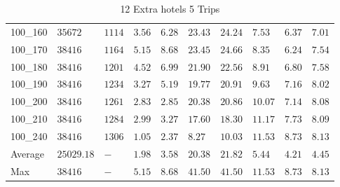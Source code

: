 \begin{center}
\begin{table}[]
\begin{adjustwidth}{-0.4in}{-1in}
\begin{tabular}{|lll|l|l|ll|lll|}
100\_160 & $35672   $  & $1114$ & $3.56$ & $6.28$   & $23.43$    & $24.24$   & $7.53 $& $6.37$   & $7.01$ \\
100\_170 & $38416   $  & $1164$ & $5.15$ & $8.68$   & $23.45$    & $24.66$   & $8.35 $& $6.24$   & $7.54$ \\
100\_180 & $38416   $  & $1201$ & $4.52$ & $6.99$   & $21.90$    & $22.56$   & $8.91 $& $6.80$   & $7.58$ \\
100\_190 & $38416   $  & $1234$ & $3.27$ & $5.19$   & $19.77$    & $20.91$   & $9.63 $& $7.16$   & $8.02$ \\
100\_200 & $38416   $  & $1261$ & $2.83$ & $2.85$   & $20.38$    & $20.86$   & $10.07$& $7.14$   & $8.08$ \\
100\_210 & $38416   $  & $1284$ & $2.99$ & $3.27$   & $17.60$    & $18.30$   & $11.17$& $7.73$   & $8.09$ \\
100\_240 & $38416   $  & $1306$ & $1.05$ & $2.37$   & $8.27$    & $10.03$   & $11.53$& $8.73$   & $8.13$ \\
\hline
Average  & $25029.18$  & $-   $ & $1.98$ & $3.58$   & $20.38$    & $21.82$   & $5.44 $& $4.21$   & $4.45$ \\
Max      & $38416   $  & $-   $ & $5.15$ & $8.68$   & $41.50$    & $41.50$   & $11.53$& $8.73$   & $8.13$ \\
\hline
\end{tabular}
    \end{adjustwidth}
    \caption{12 Extra hotels 5 Trips}
    \label{12-5}
    \end{table}
\end{center}
